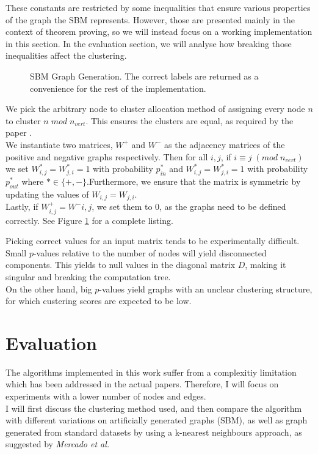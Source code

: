 \documentclass[11pt]{article}
\begin{document}
  These constants are restricted by some inequalities that ensure various properties 
  of the graph the SBM represents. However, those are presented mainly in the context
  of theorem proving, so we will instead focus on a working implementation in this 
  section. In the evaluation section, we will analyse how breaking those inequalities
  affect the clustering.

  \begin{figure}[!h]
    \label{figure:2}
     
    \caption{
      SBM Graph Generation.
      The correct labels are returned as a convenience for the rest of the implementation.
    }
  \end{figure}

  We pick the arbitrary node to cluster allocation method of assigning every node $n$
  to cluster $n \; mod \; n_{vert}$. This ensures the clusters are equal, as required by 
  the paper \cite{mercado2016clustering}. \\ 
  We instantiate two matrices, $W^+$ and $W^-$ as the adjacency matrices of the positive 
  and negative graphs respectively. Then for all $i, j$, if $i \equiv j \; (mod \; n_{vert})$
  we set $W_{i, j}^* = W_{j, i}^* = 1$ with probability $p_{in}^*$ and 
  $W_{i, j}^* = W_{j, i}^* = 1 $ with probability $p_{out}^*$
  where $* \in \{+, -\}$.Furthermore, we ensure that the matrix is symmetric by 
  updating the values of $W_{i, j} = W_{j, i}$. \\ 
  Lastly, if $W^+_{i, j} = W^-{i, j}$, we set them to 0, as the graphs need to be
  defined correctly. See Figure \ref{figure:2} for a complete listing.
  
  Picking correct values for an input matrix tends to be experimentally difficult.
  Small $p$-values relative to the number of nodes will yield disconnected 
  components. This yields to null values in the diagonal matrix $D$, making it 
  singular and breaking the computation tree. \\
  On the other hand, big $p$-values yield graphs with an unclear clustering structure,
  for which custering scores are expected to be low. 

\section{Evaluation}
\label{evaluation}
  The algorithms implemented in this work suffer from a complexitiy limitation 
  which has been addressed in the actual papers. Therefore, I will focus on 
  experiments with a lower number of nodes and edges. \\
  I will first discuss the clustering method used, and then compare the algorithm
  with different variations on artificially generated graphs (SBM), as well
  as graph generated from standard datasets by using a k-nearest neighbours 
  approach, as suggested by \emph{Mercado et al.}
\end{document}
